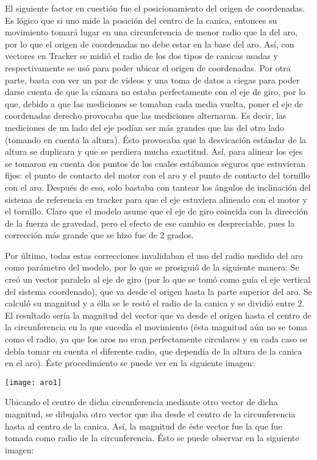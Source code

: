 \documentclass[12p]{article}
\begin{document}
El siguiente factor en cuestión fue el posicionamiento del origen de coordenadas. Es lógico que si uno mide la posición del centro de la canica, entonces su movimiento tomará lugar en una circunferencia de menor radio que la del aro, por lo que el origen de coordenadas no debe estar en la base del aro. Así, con vectores en Tracker se midió el radio de los dos tipos de canicas usadas y respectivamente se usó para poder ubicar el origen de coordenadas. Por otra parte, basta con ver un par de videos y una toma de datos a ciegas para poder darse cuenta de que la cámara no estaba perfectamente con el eje de giro, por lo que, debido a que las mediciones se tomaban cada media vuelta, poner el eje de coordenadas derecho provocaba que las mediciones alternaran. Es decir, las mediciones de un lado del eje podían ser más grandes que las del otro lado (tomando en cuenta la altura). Ésto provocaba que la desvicación estándar de la altura se duplicara y que se perdiera mucha exactitud. Así, para alinear los ejes se tomaron en cuenta dos puntos de los cuales estábamos seguros que estuvieran fijos: el punto de contacto del motor con el aro y el punto de contacto del tornillo con el aro. Después de eso, solo bastaba con tantear los ángulos de inclinación del sistema de referencia en tracker para que el eje estuviera alineado con el motor y el tornillo. Claro que el modelo asume que el eje de giro coincida con la dirección de la fuerza de gravedad, pero el efecto de ese cambio es despreciable, pues la corrección más grande que se hizo fue de 2 grados.

Por último, todas estas correcciones invalidaban el uso del radio medido del aro como parámetro del modelo, por lo que se prosiguió de la siguiente manera: Se creó un vector paralelo al eje de giro (por lo que se tomó como guía el eje vertical del sistema coordenado), que va desde el origen hasta la parte superior del aro. Se calculó su magnitud y a élla se le restó el radio de la canica y se dividió entre 2. El resultado sería la magnitud del vector que va desde el origen hasta el centro de la circunferencia en la que sucedía el movimiento (ésta magnitud aún no se toma como el radio, ya que los aros no eran perfectamente circulares y en cada caso se debía tomar en cuenta el diferente radio, que dependía de la altura de la canica en el aro). Éste procedimiento se puede ver en la siguiente imagen:

 \texttt{[image: aro1]}

Ubicando el centro de dicha circunferencia mediante otro vector de dicha magnitud, se dibujaba otro vector que iba desde el centro de la circunferencia hasta al centro de la canica. Así, la magnitud de éste vector fue la que fue tomada como radio de la circunferencia. Ésto se puede observar en la siguiente imagen:
\end{document}
